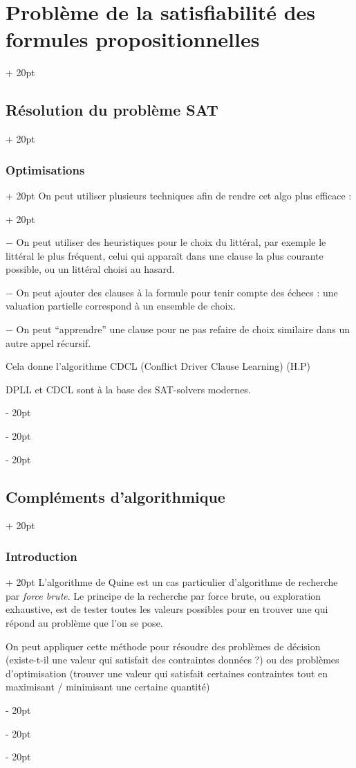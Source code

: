 \documentclass[a4paper, 12pt, twoside]{article}
\newcommand{\ind}[1][20pt]{\advance\leftskip + #1}
\newcommand{\deind}[1][20pt]{\advance\leftskip - #1}
\newenvironment{indt}[2][20pt]{#2 \par \ind[#1]}{\par \deind} %
\begin{document}
\begin{indt}{\section{Problème de la satisfiabilité des formules propositionnelles}}
\begin{indt}{\subsection{Résolution du problème SAT}}
\begin{indt}{\subsubsection{Optimisations}}
\begin{indt}{On peut utiliser plusieurs techniques afin de rendre cet algo plus efficace :}
                    \vspace{12pt}
                    
                    $-$ On peut utiliser des heuristiques pour le choix du littéral, par exemple le littéral le plus fréquent, celui qui apparaît dans une clause la plus courante possible, ou un littéral choisi au hasard.
                    
                    \vspace{12pt}
                    
                    $-$ On peut ajouter des clauses à la formule pour tenir compte des échecs : une valuation partielle correspond à un ensemble de choix.
                    
                    \vspace{12pt}
                    
                    $-$ On peut ``apprendre'' une clause pour ne pas refaire de choix similaire dans un autre appel récursif.
                    
                    Cela donne l'algorithme CDCL (Conflict Driver Clause Learning) (H.P)
                    
                    DPLL et CDCL sont à la base des SAT-solvers modernes.
                \end{indt}
            \end{indt}
        \end{indt}
        
        \vspace{12pt}
        
        \begin{indt}{\subsection{Compléments d'algorithmique}}
            \begin{indt}{\subsubsection{Introduction}}
                L'algorithme de Quine est un cas particulier d'algorithme de recherche par \textit{force brute}. Le principe de la recherche par force brute, ou exploration exhaustive, est de tester toutes les valeurs possibles pour en trouver une qui répond au problème que l'on se pose.
                
                On peut appliquer cette méthode pour résoudre des problèmes de décision (existe-t-il une valeur qui satisfait des contraintes données ?) ou des problèmes d'optimisation (trouver une valeur qui satisfait certaines contraintes tout en maximisant / minimisant une certaine quantité)
                

\end{indt}
\end{indt}
\end{indt}
\end{document}
